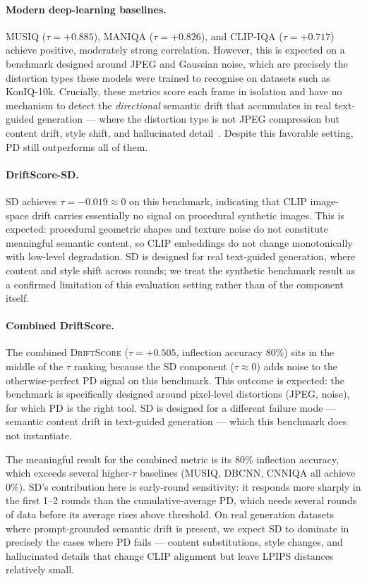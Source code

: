 \documentclass[sigconf]{acmart}
\newcommand{\DS}{\textsc{DriftScore}}
\newcommand{\PD}{\ensuremath{\mathrm{PD}}}
\newcommand{\SD}{\ensuremath{\mathrm{SD}}}
\begin{document}
\paragraph{Modern deep-learning baselines.}
MUSIQ ($\tau = +0.885$), MANIQA ($\tau = +0.826$), and CLIP-IQA
($\tau = +0.717$) achieve positive, moderately strong correlation.
However, this is expected on a benchmark designed around JPEG and Gaussian
noise, which are precisely the distortion types these models were trained
to recognise on datasets such as KonIQ-10k.
Crucially, these metrics score each frame in isolation and have no
mechanism to detect the \emph{directional} semantic drift that accumulates
in real text-guided generation --- where the distortion type is not
JPEG compression but content drift, style shift, and hallucinated
detail~\cite{edival2026}.
Despite this favorable setting, $\PD$ still outperforms all of them.

\paragraph{DriftScore-SD.}
$\SD$ achieves $\tau = -0.019 \approx 0$ on this benchmark, indicating
that CLIP image-space drift carries essentially no signal on procedural
synthetic images.
This is expected: procedural geometric shapes and texture noise do not
constitute meaningful semantic content, so CLIP embeddings do not change
monotonically with low-level degradation.
$\SD$ is designed for real text-guided generation, where content and
style shift across rounds; we treat the synthetic benchmark result as a
confirmed limitation of this evaluation setting rather than of the
component itself.

\paragraph{Combined DriftScore.}
The combined \DS{} ($\tau = +0.505$, inflection accuracy 80\%) sits in
the middle of the $\tau$ ranking because the SD component ($\tau \approx 0$)
adds noise to the otherwise-perfect PD signal on this benchmark.
This outcome is expected: the benchmark is specifically designed around
pixel-level distortions (JPEG, noise), for which PD is the right tool.
SD is designed for a different failure mode --- semantic content drift
in text-guided generation --- which this benchmark does not instantiate.

The meaningful result for the combined metric is its 80\% inflection
accuracy, which exceeds several higher-$\tau$ baselines (MUSIQ, DBCNN,
CNNIQA all achieve 0\%).
SD's contribution here is early-round sensitivity: it responds more
sharply in the first 1--2 rounds than the cumulative-average PD, which
needs several rounds of data before its average rises above threshold.
On real generation datasets where prompt-grounded semantic drift is
present, we expect SD to dominate in precisely the cases where PD fails
--- content substitutions, style changes, and hallucinated details that
change CLIP alignment but leave LPIPS distances relatively small.
\end{document}
